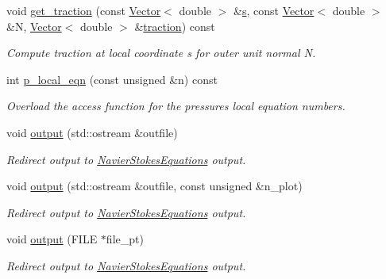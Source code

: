 \begin{DoxyCompactItemize}
void \hyperlink{classoomph_1_1AxisymmetricQCrouzeixRaviartElement_a60ea4ee3c006bc04984f1dcadb87a79d}{get\+\_\+traction} (const \hyperlink{classoomph_1_1Vector}{Vector}$<$ double $>$ \&\hyperlink{cfortran_8h_ab7123126e4885ef647dd9c6e3807a21c}{s}, const \hyperlink{classoomph_1_1Vector}{Vector}$<$ double $>$ \&N, \hyperlink{classoomph_1_1Vector}{Vector}$<$ double $>$ \&\hyperlink{classoomph_1_1AxisymmetricNavierStokesEquations_a0a5523b91d5191c2f9e23fe8d74f4e07}{traction}) const
\begin{DoxyCompactList}\small\item\em Compute traction at local coordinate s for outer unit normal N. \end{DoxyCompactList}\item 
int \hyperlink{classoomph_1_1AxisymmetricQCrouzeixRaviartElement_adc569122e3649deba56231175f3116cf}{p\+\_\+local\+\_\+eqn} (const unsigned \&n) const
\begin{DoxyCompactList}\small\item\em Overload the access function for the pressure\textquotesingle{}s local equation numbers. \end{DoxyCompactList}\item 
void \hyperlink{classoomph_1_1AxisymmetricQCrouzeixRaviartElement_af7811d55e87a839fb5c01d9e306cfda8}{output} (std\+::ostream \&outfile)
\begin{DoxyCompactList}\small\item\em Redirect output to \hyperlink{classoomph_1_1NavierStokesEquations}{Navier\+Stokes\+Equations} output. \end{DoxyCompactList}\item 
void \hyperlink{classoomph_1_1AxisymmetricQCrouzeixRaviartElement_afb5ef7f9b09d4b3ed6d5ee04cad58fec}{output} (std\+::ostream \&outfile, const unsigned \&n\+\_\+plot)
\begin{DoxyCompactList}\small\item\em Redirect output to \hyperlink{classoomph_1_1NavierStokesEquations}{Navier\+Stokes\+Equations} output. \end{DoxyCompactList}\item 
void \hyperlink{classoomph_1_1AxisymmetricQCrouzeixRaviartElement_a89e6624edb01f732c6c10b068227de54}{output} (F\+I\+LE $\ast$file\+\_\+pt)
\begin{DoxyCompactList}\small\item\em Redirect output to \hyperlink{classoomph_1_1NavierStokesEquations}{Navier\+Stokes\+Equations} output. \end{DoxyCompactList}\item 

\end{DoxyCompactItemize}
